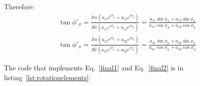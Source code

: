\documentclass{iucr}
\begin{document}
Therefore:
\begin{eqnarray}
\label{final2}
\tan{\phi'_\sigma} = \frac{Im(a_{11} e^{i \phi_\sigma} + a_{12} e^{i \phi_\pi})}
                          {Re(a_{11} e^{i \phi_\sigma} + a_{12} e^{i \phi_\pi})} = 
                          \frac{a_{11} \sin{\phi_\sigma} + a_{12} \sin{\phi_\pi}}
                               {a_{11} \cos{\phi_\sigma} + a_{12} \cos{\phi_\pi}}  \nonumber \\ 
\tan{\phi'_\pi} =  \frac{Im(a_{21} e^{i \phi_\sigma} + a_{22} e^{i \phi_\pi})}
                        {Re(a_{21} e^{i \phi_\sigma} + a_{22} e^{i \phi_\pi})} = 
                        \frac{a_{21} \sin{\phi_\sigma} + a_{22} \sin{\phi_\pi}}
                             {a_{21} \cos{\phi_\sigma} + a_{22} \cos{\phi_\pi}}
\end{eqnarray}


The code that implements Eq.~\ref{final1} and Eq.~\ref{final2} is in listing~\ref{lst:rotationelements}: 




\end{document}
